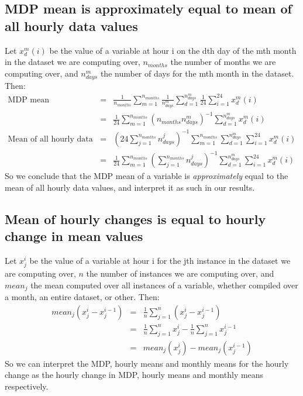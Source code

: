 \subsection{MDP mean is approximately equal to mean of all hourly data values}

Let $x^m_d(i)$ be the value of a variable at hour i on the dth day of the mth month in the dataset we are computing over, $n_{months}$ the number of months we are computing over, and $n^m_{days}$ the number of days for the mth month in the dataset. Then:
\begin{eqnarray}
	\mbox{MDP mean} &=& \frac{1}{n_{months}} \sum_{m=1}^{n_{months}} \frac{1}{n^m_{days}} \sum_{d=1}^{n^m_{days}} \frac{1}{24} \sum_{i=1}^{24} x^m_d (i) \\
	&=& \frac{1}{24} \sum_{m=1}^{n_{months}} (n_{months} n^m_{days})^{-1} \sum_{d=1}^{n^m_{days}} x^m_d (i) \nonumber \\
	\mbox{Mean of all hourly data values} &=& \left(24 \sum_{j=1}^{n_{months}} n^j_{days} \right)^{-1} \sum_{m=1}^{n_{months}} \sum_{d=1}^{n^m_{days}} \sum_{i=1}^{24} x^m_d (i) \\
	&=& \frac{1}{24} \sum_{m=1}^{n_{months}} \left( \sum_{j=1}^{n_{months}} n^j_{days} \right)^{-1} \sum_{d=1}^{n^m_{days}} \sum_{i=1}^{24} x^m_d (i) \nonumber
\end{eqnarray}
So we conclude that the \ac{MDP} mean of a variable is \textit{approximately} equal to the mean of all hourly data values, and interpret it as such in our results.

\subsection{Mean of hourly changes is equal to hourly change in mean values}

Let $x^i_j$ be the value of a variable at hour i for the jth instance in the dataset we are computing over, $n$ the number of instances we are computing over, and $mean_j$ the mean computed over all instances of a variable, whether compiled over a month, an entire dataset, or other. Then:
\begin{eqnarray}
	mean_j(x^i_j - x^{i-1}_j) &=& \frac{1}{n} \sum_{j=1}^{n} (x^i_j - x^{i-1}_j) \\
	&=& \frac{1}{n} \sum_{j=1}^{n} x^i_j - \frac{1}{n} \sum_{j=1}^{n} x^{i-1}_j \nonumber \\
	&=& mean_j(x^i_j) - mean_j(x^{i-1}_j) \nonumber
\end{eqnarray}
So we can interpret the \ac{MDP}, hourly means and monthly means for the hourly change as the hourly change in \ac{MDP}, hourly means and monthly means respectively.

